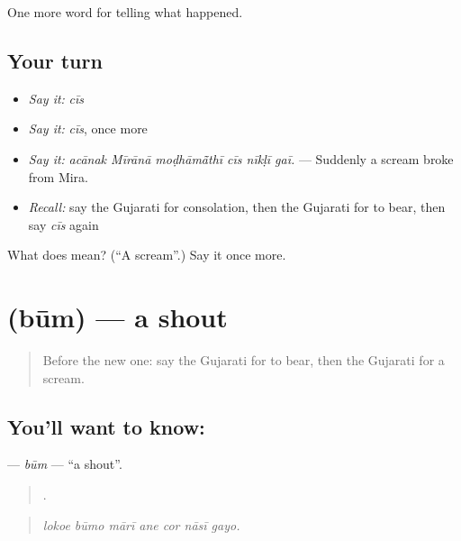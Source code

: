\begin{grammarlens}[title={What you've built}]
One more word for telling what happened.
\end{grammarlens}

\subsection*{Your turn}
\begin{itemize}
\raggedright
  \item \emph{Say it:} \emph{cīs}
  \item \emph{Say it:} \emph{cīs}, once more
  \item \emph{Say it:} \emph{acānak Mīrānā moḍhāmā̃thī cīs nīkḷī gaī.} — Suddenly a scream broke from Mira.
  \item \emph{Recall:} say the Gujarati for consolation, then the Gujarati for to bear, then say \emph{cīs} again
\end{itemize}

\begin{tcolorbox}[breakable,colback=teal!4,colframe=teal!35!black,title={Before you move on}]
What does  mean? (\textquotedblleft{}A scream\textquotedblright{}.) Say it once more.
\end{tcolorbox}
\section[\texorpdfstring{\gu{બૂમ} (būm)}{બૂમ (būm)}]{ (būm) — a shout}

\label{lesson:GU-C299-bum}



\begin{quote}
Before the new one: say the Gujarati for to bear, then the Gujarati for a scream.
\end{quote}

\subsection*{You'll want to know: }
\textbf{} — \emph{būm} — \textquotedblleft{}a shout\textquotedblright{}.

\begin{quote}
      .
\end{quote}

\begin{quote}
\emph{lokoe būmo mārī ane cor nāsī gayo.}
\end{quote}

